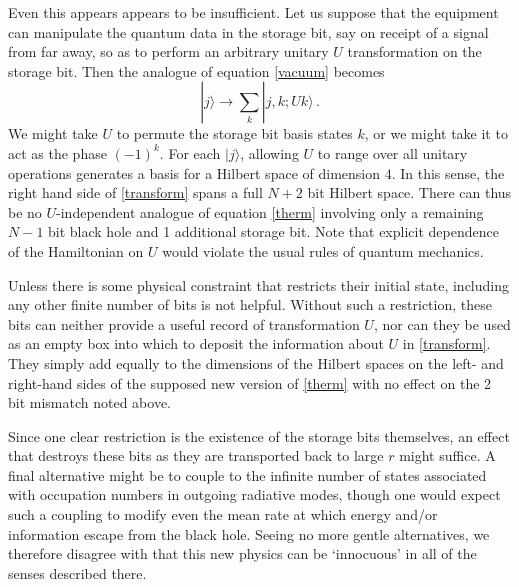 \documentclass[12pt]{article}
\begin{document}
Even this appears appears to be insufficient.
{Let us} suppose that the equipment can manipulate the quantum data in the storage bit, say on receipt of a signal from far away, so as to perform an arbitrary unitary $U$ transformation on the
 storage bit.  Then the analogue of equation \eqref{vacuum} becomes
\begin{equation}
\label{transform}
|j\rangle \to \sum_k |j , k ; U k\rangle \,.
\end{equation}
We might take $U$ to permute the storage bit basis states $k$, or we might take it to act as the phase $(-1)^k$.
For each $|j\rangle$, allowing $U$ to range over all unitary operations generates a basis for a Hilbert space of dimension $4$. In this sense, the right hand side of \eqref{transform} spans a full $N+2$ bit Hilbert space. There can thus be no $U$-independent analogue of equation \eqref{therm} involving only a remaining $N-1$ bit black hole and 1 additional storage bit.  {Note that explicit dependence of the Hamiltonian on $U$ would violate the usual rules of quantum mechanics.}


Unless there is some physical constraint that restricts their initial state,
including any other finite number of bits is not helpful.   Without such a restriction, these bits can neither provide a useful record of transformation $U$, nor can they be used as an empty box into which to deposit the information about $U$ in \eqref{transform}.   They simply add equally to the dimensions of the Hilbert spaces on the left- and right-hand sides of the supposed new version of \eqref{therm} with no effect on the 2 bit mismatch noted above.

Since one clear restriction is the existence of the storage bits themselves, an effect that destroys these bits as they are transported back to large $r$ might suffice. A final alternative might be to couple
to the infinite number of states associated with occupation numbers in outgoing radiative modes, though one would expect such a coupling to modify even the mean rate at which energy and/or information escape from the black hole.  Seeing no more gentle alternatives, we therefore disagree with \cite{Giddings:2011ks} that this new physics can be `innocuous' in all of the senses described there.
\end{document}
